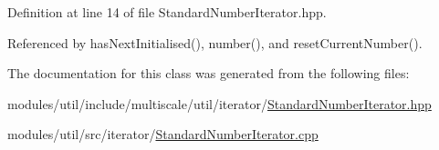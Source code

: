 Definition at line 14 of file Standard\-Number\-Iterator.\-hpp.



Referenced by has\-Next\-Initialised(), number(), and reset\-Current\-Number().



The documentation for this class was generated from the following files\-:\begin{DoxyCompactItemize}
\item 
modules/util/include/multiscale/util/iterator/\hyperlink{StandardNumberIterator_8hpp}{Standard\-Number\-Iterator.\-hpp}\item 
modules/util/src/iterator/\hyperlink{StandardNumberIterator_8cpp}{Standard\-Number\-Iterator.\-cpp}\end{DoxyCompactItemize}
